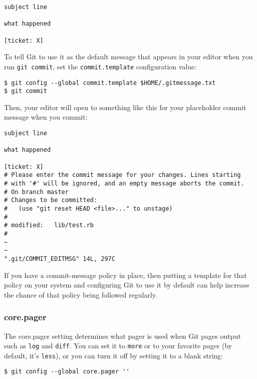 \documentclass[a4paper]{book}
\begin{document}
\begin{shaded}\begin{verbatim}
subject line

what happened

[ticket: X]
\end{verbatim}\end{shaded}

To tell Git to use it as the default message that appears in your editor when you run \texttt{git commit}, set the \texttt{commit.template} configuration value:

\begin{shaded}\begin{verbatim}
$ git config --global commit.template $HOME/.gitmessage.txt
$ git commit
\end{verbatim}\end{shaded}

Then, your editor will open to something like this for your placeholder commit message when you commit:

\begin{shaded}\begin{verbatim}
subject line

what happened

[ticket: X]
# Please enter the commit message for your changes. Lines starting
# with '#' will be ignored, and an empty message aborts the commit.
# On branch master
# Changes to be committed:
#   (use "git reset HEAD <file>..." to unstage)
#
# modified:   lib/test.rb
#
~
~
".git/COMMIT_EDITMSG" 14L, 297C
\end{verbatim}\end{shaded}

If you have a commit-message policy in place, then putting a template for that policy on your system and configuring Git to use it by default can help increase the chance of that policy being followed regularly.

\subsubsection{core.pager}

The core.pager setting determines what pager is used when Git pages output such as \texttt{log} and \texttt{diff}. You can set it to \texttt{more} or to your favorite pager (by default, it's \texttt{less}), or you can turn it off by setting it to a blank string:

\begin{shaded}\begin{verbatim}
$ git config --global core.pager ''
\end{verbatim}\end{shaded}
\end{document}

